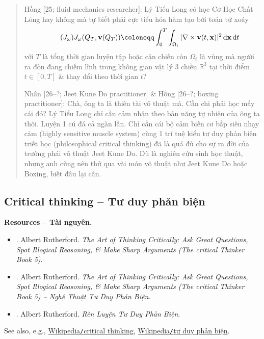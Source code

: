 \documentclass[12pt,twoside]{book}
\begin{document}
\begin{quote}
	{\sf Hồng [25; fluid mechanics researcher]}: {\sc Lý Tiểu Long} có học Cơ Học Chất Lỏng hay không mà tự biết phải cực tiểu hóa hàm tạo bởi toán tử xoáy
	\begin{equation}
		\label{curl cost functional}
		\tag{$J_\omega$}
		J_\omega(Q_T,{\bf v}(Q_T))\coloneqq\int_0^T\int_{\Omega_t} |\nabla\times{\bf v}(t,{\bf x})|^2\,{\rm d}{\bf x}\,{\rm d}t
	\end{equation}
	với $T$ là tổng thời gian luyện tập hoặc cận chiến còn $\Omega_t$ là vùng mà người ra đòn đang chiếm lĩnh trong không gian vật lý 3 chiều $\mathbb{R}^3$ tại thời điểm $t\in[0,T]$ \& thay đổi theo thời gian $t$?
	
	{\sf Nhân [26--?; Jeet Kune Do practitioner] \& Hồng [26--?; boxing practitioner]}: Chà, ông ta là thiên tài võ thuật mà. Cần chi phải học mấy cái đó? {\sc Lý Tiểu Long} chỉ cần cảm nhận theo bản năng tự nhiên của ông ta thôi. Luyện 1 cú đá cả ngàn lần. Chỉ cần cái bộ cảm biến cơ bắp siêu nhạy cảm (highly sensitive muscle system) cùng 1 trí tuệ kiểu tư duy phản biện triết học (philosophical critical thinking) đã là quá đủ cho sự ra đời của trường phái võ thuật Jeet Kune Do. Dù là nghiên cứu sinh học thuật, nhưng anh cũng nên thử qua vài món võ thuật như Jeet Kune Do hoặc Boxing, biết đâu lại cần.
\end{quote}

\subsection{Critical thinking -- Tư duy phản biện}
\textbf{\textsf{Resources -- Tài nguyên.}}
\begin{itemize}
	\item \cite{Rutherford_critical_thinking}. {\sc Albert Rutherford}. {\it The Art of Thinking Critically: Ask Great Questions, Spot Illogical Reasoning, \& Make Sharp Arguments (The critical Thinker Book 5)}.
	\item \cite{Rutherford_critical_thinking_VN}. {\sc Albert Rutherford}. {\it The Art of Thinking Critically: Ask Great Questions, Spot Illogical Reasoning, \& Make Sharp Arguments (The critical Thinker Book 5) -- Nghệ Thuật Tư Duy Phản Biện}.
	\item \cite{Rutherford_practice_critical_thinking_VN}. {\sc Albert Rutherford}. {\it Rèn Luyện Tư Duy Phản Biện}.
\end{itemize}
See also, e.g., \href{https://en.wikipedia.org/wiki/Critical_thinking}{Wikipedia{\tt/}critical thinking}, \href{https://vi.wikipedia.org/wiki/T%C6%B0_duy_ph%E1%BA%A3n_bi%E1%BB%87n}{Wikipedia{\tt/}tư duy phản biện}.
\end{document}
